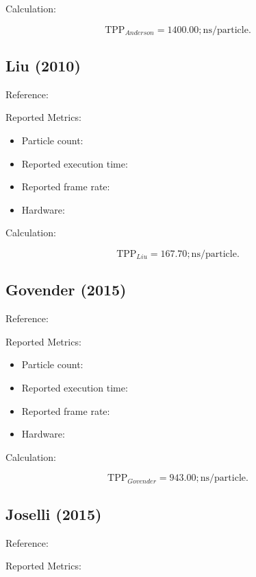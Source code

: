 Calculation:

\begin{equation}
\mathrm{TPP}_{Anderson}=1400.00;\mathrm{ns/particle}.
\end{equation}

\subsection{Liu (2010)}

Reference:
\cite{liu}

Reported Metrics:

\begin{itemize}
\item Particle count:
\item Reported execution time:
\item Reported frame rate:
\item Hardware:
\end{itemize}

Calculation:

\begin{equation}
\mathrm{TPP}_{Liu}=167.70;\mathrm{ns/particle}.
\end{equation}

\subsection{Govender (2015)}

Reference:
\cite{govender}

Reported Metrics:

\begin{itemize}
\item Particle count:
\item Reported execution time:
\item Reported frame rate:
\item Hardware:
\end{itemize}

Calculation:

\begin{equation}
\mathrm{TPP}_{Govender}=943.00;\mathrm{ns/particle}.
\end{equation}

\subsection{Joselli (2015)}

Reference:
\cite{joselli}

Reported Metrics:

